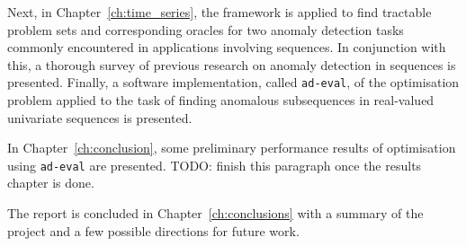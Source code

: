 Next, in Chapter~\ref{ch:time_series}, the framework is applied to find tractable problem sets and corresponding oracles for two anomaly detection tasks commonly encountered in applications involving sequences. In conjunction with this, a thorough survey of previous research on anomaly detection in sequences is presented. Finally, a software implementation, called \texttt{ad-eval}, of the optimisation problem applied to the task of finding anomalous subsequences in real-valued univariate sequences is presented.

In Chapter~\ref{ch:conclusion}, some preliminary performance results of optimisation using \texttt{ad-eval} are presented. TODO: finish this paragraph once the results chapter is done.

The report is concluded in Chapter~\ref{ch:conclusions} with a summary of the project and a few possible directions for future work.
